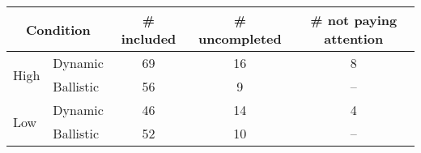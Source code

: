 \documentclass[11pt, oneside]{article}   	%
\begin{document}
\begin{table}[t]
\renewcommand{\arraystretch}{1.5}
\centering
\begin{tabular}[c]{| p{1cm} | l | c | c | c| }
\hline
\multicolumn{2}{|c|}{Condition}& \textrm{\# included} & \textrm{\# uncompleted} & \textrm{\# not paying attention }\\
\hline
\multirow{2}{*}{High} & Dynamic & 69 & 16 & 8 \\
				& Ballistic & 56 & 9 & -- \\
				\hline
\multirow{2}{*}{Low} & Dynamic & 46 & 14 & 4 \\
				& Ballistic & 52 & 10 & -- \\
				\hline
\end{tabular}

\label{tab:participants}
\end{table}
\end{document}
